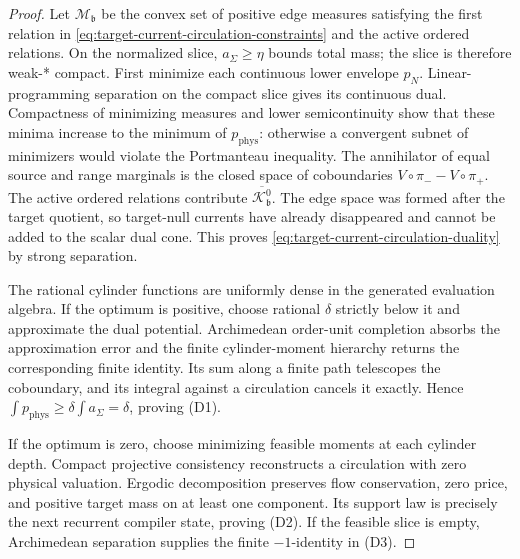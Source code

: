 \documentclass[11pt]{article}
\numberwithin{section}{part}
\theoremstyle{plain}
\theoremstyle{definition}
\theoremstyle{remark}
\newcommand{\Phys}{\mathrm{phys}}
\begin{document}
\begin{proof}
Let \(\mathcal M_{\mathfrak b}\) be the convex set of positive edge measures
satisfying the first relation in
\eqref{eq:target-current-circulation-constraints} and the active ordered
relations.  On the normalized slice, \(a_\Sigma\ge\eta\) bounds total mass;
the slice is therefore weak-* compact.  First minimize each continuous lower
envelope \(p_N\).  Linear-programming separation on the compact slice gives
its continuous dual.  Compactness of minimizing measures and lower
semicontinuity show that these minima increase to the minimum of
\(p_{\Phys}\): otherwise a convergent subnet of minimizers would violate the
Portmanteau inequality.  The annihilator
of equal source and range marginals is the closed space of coboundaries
\(V\circ\pi_- -V\circ\pi_+\).  The active ordered relations contribute
\(\overline{\mathcal K^{0}_{\mathfrak b}}\).  The edge space was formed after
the target quotient, so target-null currents have already disappeared and
cannot be added to the scalar dual cone.  This proves
\eqref{eq:target-current-circulation-duality} by strong separation.

The rational cylinder functions are uniformly dense in the generated
evaluation algebra.  If the optimum is positive, choose rational \(\delta\)
strictly below it and approximate the dual potential.  Archimedean
order-unit completion absorbs the approximation error and the finite
cylinder-moment hierarchy returns the corresponding finite identity.  Its
sum along a finite path telescopes the coboundary, and its integral against
a circulation cancels it exactly.  Hence
\(\int p_{\Phys}\ge\delta\int a_\Sigma=\delta\), proving \textup{(D1)}.

If the optimum is zero, choose minimizing feasible moments at each cylinder
depth.  Compact projective consistency reconstructs a circulation with zero
physical valuation.  Ergodic decomposition preserves flow conservation,
zero price, and positive target mass on at least one component.  Its support
law is precisely the next recurrent compiler state, proving \textup{(D2)}.
If the feasible slice is empty, Archimedean separation supplies the finite
\(-1\)-identity in \textup{(D3)}.
\end{proof}
\end{document}
